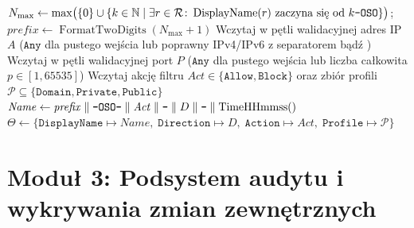 \begin{algorithm}[H]
    \caption{Walidacja parametrów, dobór profilu sieciowego i rejestracja nowej reguły zapory}\label{alg:tworzenie-reguly}
    $N_{\max} \leftarrow \max\bigl(\{0\} \cup \{k \in \mathbb{N} \mid \exists r \in \mathcal{R}\colon \operatorname{DisplayName}(r) \text{ zaczyna się od } k\text{\texttt{-OSO}}\}\bigr)$;\;
    $\mathit{prefix} \leftarrow \operatorname{FormatTwoDigits}(N_{\max} + 1)$\;
    Wczytaj w pętli walidacyjnej adres IP $A$ ($\texttt{Any}$ dla pustego wejścia lub poprawny IPv4/IPv6 z separatorem  bądź \code{:})\;
    Wczytaj w pętli walidacyjnej port $P$ ($\texttt{Any}$ dla pustego wejścia lub liczba całkowita $p \in [1, 65535]$)\;
    Wczytaj akcję filtru $\mathit{Act} \in \{\texttt{Allow}, \texttt{Block}\}$ oraz zbiór profili $\mathcal{P} \subseteq \{\texttt{Domain}, \texttt{Private}, \texttt{Public}\}$\;
    $\mathit{Name} \leftarrow \mathit{prefix} \parallel \text{\texttt{-OSO-}} \parallel \mathit{Act} \parallel \text{\texttt{-}} \parallel D \parallel \text{\texttt{-}} \parallel \operatorname{TimeHHmmss}()$\;
    $\Theta \leftarrow \{\texttt{DisplayName} \mapsto \mathit{Name},\; \texttt{Direction} \mapsto D,\; \texttt{Action} \mapsto \mathit{Act},\; \texttt{Profile} \mapsto \mathcal{P}\}$\;
    \;
\end{algorithm}

\section{Moduł 3: Podsystem audytu i wykrywania zmian zewnętrznych}\label{sec:modul-logowanie}

